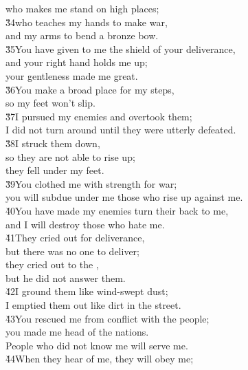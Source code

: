 \begin{poetry}
\poemll    who makes me stand on high places; \\
\poeml \v{34}who teaches my hands to make war, \\
\poemll    and my arms to bend a bronze bow. \\
\poeml \v{35}You have given to me the shield of your deliverance, \\
\poemll    and your right hand holds me up; \\
\poemlll       your gentleness made me great. \\
\poeml \v{36}You make a broad place for my steps, \\
\poemll    so my feet won't slip. \\
\poeml \v{37}I pursued my enemies and overtook them; \\
\poemll    I did not turn around until they were utterly defeated. \\
\poeml \v{38}I struck them down, \\
\poemll    so they are not able to rise up; \\
\poemlll       they fell under my feet. \\
\poeml \v{39}You clothed me with strength for war; \\
\poemll    you will subdue under me those who rise up against me. \\
\poeml \v{40}You have made my enemies turn their back to me, \\
\poemll    and I will destroy those who hate me. \\
\poeml \v{41}They cried out for deliverance, \\
\poemll    but there was no one to deliver; \\
\poeml they cried out to the , \\
\poemll    but he did not answer them. \\
\poeml \v{42}I ground them like wind-swept dust; \\
\poemll    I emptied them out like dirt in the street. \\
\poeml \v{43}You rescued me from conflict with the people; \\
\poemll    you made me head of the nations. \\
\poemlll       People who did not know me will serve me. \\
\poeml \v{44}When they hear of me, they will obey me; \\

\end{poetry}
